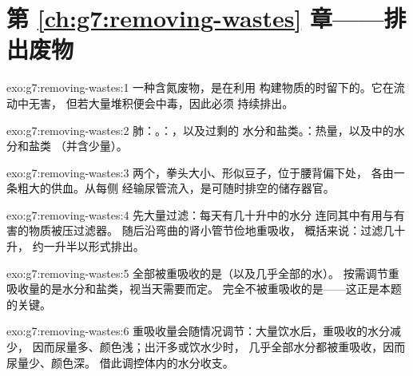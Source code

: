 \section*{第 \ref{ch:g7:removing-wastes} 章——排出废物}

\begin{solution}{exo:g7:removing-wastes:1}
一种含氮废物，是在利用
构建物质的时留下的。它在流动中无害，
但若大量堆积便会中毒，因此必须
持续排出。
\end{solution}

\begin{solution}{exo:g7:removing-wastes:2}
肺：。：，以及过剩的
水分和盐类。：热量，以及中的水分和盐类
（并含少量）。
\end{solution}

\begin{solution}{exo:g7:removing-wastes:3}
两个，拳头大小、形似豆子，位于腰背偏下处，
各由一条粗大的供血。从每侧
经输尿管流入，是可随时排空的储存器官。
\end{solution}

\begin{solution}{exo:g7:removing-wastes:4}
先大量过滤：每天有几十升中的水分
连同其中有用与有害的物质被压过滤器。
随后沿弯曲的肾小管节俭地重吸收，
概括来说：过滤几十升，
约一升半以形式排出。
\end{solution}

\begin{solution}{exo:g7:removing-wastes:5}
全部被重吸收的是（以及几乎全部的水）。
按需调节重吸收量的是水分和盐类，视当天需要而定。
完全不被重吸收的是——这正是本题的关键。
\end{solution}

\begin{solution}{exo:g7:removing-wastes:6}
重吸收量会随情况调节：大量饮水后，重吸收的水分减少，
因而尿量多、颜色浅；出汗多或饮水少时，
几乎全部水分都被重吸收，因而尿量少、颜色深。
借此调控体内的水分收支。
\end{solution}

